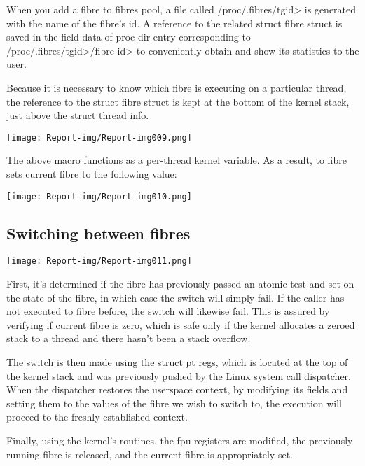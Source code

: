 {\textbullet} When you add a fibre to fibres pool, a file called /proc/.fibres/tgid{\textgreater} is generated with the name of the fibre's id. A reference to the related struct fibre struct is saved in the field data of proc dir entry corresponding to /proc/.fibres/tgid{\textgreater}/fibre id{\textgreater} to conveniently obtain and show its statistics to the user.

{\textbullet} Because it is necessary to know which fibre is executing on a particular thread, the reference to the struct fibre struct is kept at the bottom of the kernel stack, just above the struct thread info.

 \texttt{[image: Report-img/Report-img009.png]} 

The above macro functions as a per-thread kernel variable. As a result, to fibre sets current fibre to the following value:

 \texttt{[image: Report-img/Report-img010.png]} 

\subsection{Switching between fibres }
 \texttt{[image: Report-img/Report-img011.png]} 

First, it's determined if the fibre has previously passed an atomic test-and-set on the state of the fibre, in which case the switch will simply fail. If the caller has not executed to fibre before, the switch will likewise fail. This is assured by verifying if current fibre is zero, which is safe only if the kernel allocates a zeroed stack to a thread and there hasn't been a stack overflow.

The switch is then made using the struct pt regs, which is located at the top of the kernel stack and was previously pushed by the Linux system call dispatcher. When the dispatcher restores the userspace context, by modifying its fields and setting them to the values of the fibre we wish to switch to, the execution will proceed to the freshly established context.

Finally, using the kernel's routines, the fpu registers are modified, the previously running fibre is released, and the current fibre is appropriately set.

